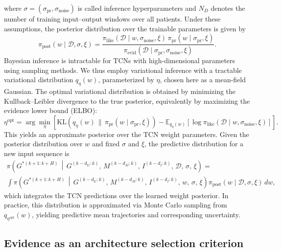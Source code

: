 \documentclass[preprint,12pt]{elsarticle}
\begin{document}
%
where \(\sigma=(\sigma_{\mathrm{pr}},\sigma_{\mathrm{noise}})\) is called inference hyperparameters and 
\(N_D\) denotes the number of training input--output windows
over all patients.
Under these assumptions, the posterior distribution over the  trainable parameters is given by
\begin{equation}
\label{eq:bayes_w}
\pi_{\mathrm{post}}(w\mid \mathcal{D},\sigma,\xi)
=
\frac{\pi_{\mathrm{like}}(\mathcal{D}\mid w,\sigma_{\mathrm{noise}},\xi)\,\pi_{\mathrm{pr}}(w\mid \sigma_{\mathrm{pr}},\xi)}
{\pi_{\mathrm{evid}}(\mathcal{D}\mid \sigma_{\mathrm{pr}},\sigma_{\mathrm{noise}},\xi)}.
\end{equation}
%
Bayesian inference is intractable for TCNs with high-dimensional parameters using sampling methods. We thus employ variational inference with a tractable variational distribution \(q_{\eta}(w)\), parameterized by \(\eta\), chosen here as a mean-field Gaussian. The optimal variational distribution is obtained by minimizing the Kullback--Leibler divergence to the true posterior, equivalently by maximizing the evidence lower bound (ELBO):
%
\begin{equation}
\eta^{\mathrm{opt}}
=
\arg\min_{\eta}
\left[
\mathrm{KL}\!\left(
q_{\eta}(w)\,\|\,\pi_{\mathrm{pr}}(w \mid \sigma_{\mathrm{pr}},\xi)
\right)
-
\mathbb{E}_{q_{\eta}(w)}
\left[
\log \pi_{\mathrm{like}}(\mathcal{D} \mid w,\sigma_{\mathrm{noise}},\xi)
\right]
\right].
\end{equation}
%
This yields an approximate posterior over the TCN weight parameters.
Given the posterior distribution over \(w\) and fixed \(\sigma\) and \(\xi\), the predictive distribution for a new input sequence is
\begin{align}
\pi\!\left(
G^{*(k+1:k+H)}
\,\middle|\,
G^{(k-d_G:k)},\, M^{(k-d_M:k)},\, I^{(k-d_I:k)},\, \mathcal{D},\, \sigma,\, \xi
\right) = 
\nonumber \\
\int
\pi\!\left(
G^{*(k+1:k+H)}
\,\middle|\,
G^{(k-d_G:k)},\, M^{(k-d_M:k)},\, I^{(k-d_I:k)},\, w,\, \sigma,\, \xi
\right)
\pi_{\mathrm{post}}(w\mid \mathcal{D},\sigma,\xi)\,dw,
\label{eq:posterior_predictive}
\end{align}
%
which integrates the TCN predictions over the learned weight posterior. In practice, this distribution is approximated via Monte Carlo sampling from \(q_{\eta^{\mathrm{opt}}}(w)\), yielding predictive mean trajectories and corresponding uncertainty.


\subsection{Evidence as an architecture selection criterion}
\label{sec:plausibility}
\end{document}
